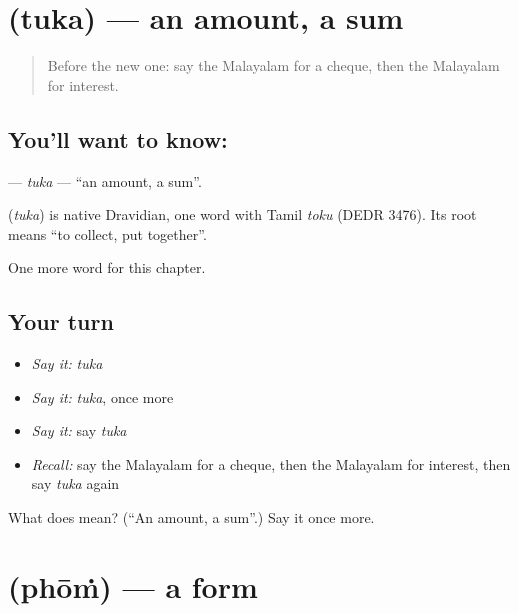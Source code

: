 \section[\texorpdfstring{\ml{തുക} (tuka)}{തുക (tuka)}]{ (tuka) — an amount, a sum}

\label{lesson:ML-C288-tuka}



\begin{quote}
Before the new one: say the Malayalam for a cheque, then the Malayalam for interest.
\end{quote}

\subsection*{You'll want to know: }
\textbf{} — \emph{tuka} — \textquotedblleft{}an amount, a sum\textquotedblright{}.

\begin{cousinweb}
\textbf{} (\emph{tuka}) is native Dravidian, one word with Tamil \emph{toku} (DEDR 3476). Its root means \textquotedblleft{}to collect, put together\textquotedblright{}.
\end{cousinweb}

\begin{grammarlens}[title={What you've built}]
One more word for this chapter.
\end{grammarlens}

\subsection*{Your turn}
\begin{itemize}
\raggedright
  \item \emph{Say it:} \emph{tuka}
  \item \emph{Say it:} \emph{tuka}, once more
  \item \emph{Say it:} say \emph{tuka}
  \item \emph{Recall:} say the Malayalam for a cheque, then the Malayalam for interest, then say \emph{tuka} again
\end{itemize}

\begin{tcolorbox}[breakable,colback=teal!4,colframe=teal!35!black,title={Before you move on}]
What does  mean? (\textquotedblleft{}An amount, a sum\textquotedblright{}.) Say it once more.
\end{tcolorbox}
\section[\texorpdfstring{\ml{ഫോം} (phōṁ)}{ഫോം (phōṁ)}]{ (phōṁ) — a form}

